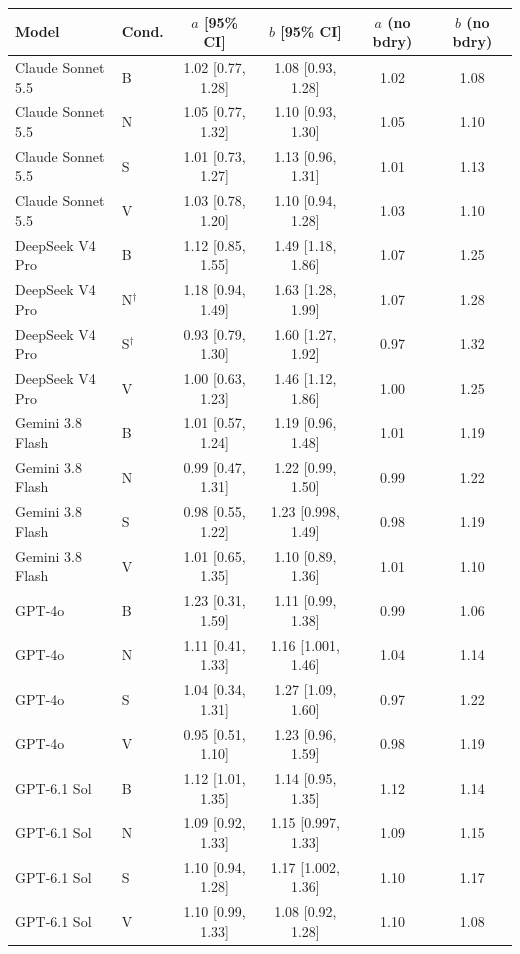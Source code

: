 \begin{tabular}{llcccc}
\toprule
Model & Cond. & $a$ [95\% CI] & $b$ [95\% CI] & $a$ (no bdry) & $b$ (no bdry) \\
\midrule
Claude Sonnet 5.5 & B & 1.02 [0.77, 1.28] & 1.08 [0.93, 1.28] & 1.02 & 1.08 \\
Claude Sonnet 5.5 & N & 1.05 [0.77, 1.32] & 1.10 [0.93, 1.30] & 1.05 & 1.10 \\
Claude Sonnet 5.5 & S & 1.01 [0.73, 1.27] & 1.13 [0.96, 1.31] & 1.01 & 1.13 \\
Claude Sonnet 5.5 & V & 1.03 [0.78, 1.20] & 1.10 [0.94, 1.28] & 1.03 & 1.10 \\
DeepSeek V4 Pro & B & 1.12 [0.85, 1.55] & 1.49 [1.18, 1.86] & 1.07 & 1.25 \\
DeepSeek V4 Pro & N$^\dagger$ & 1.18 [0.94, 1.49] & 1.63 [1.28, 1.99] & 1.07 & 1.28 \\
DeepSeek V4 Pro & S$^\dagger$ & 0.93 [0.79, 1.30] & 1.60 [1.27, 1.92] & 0.97 & 1.32 \\
DeepSeek V4 Pro & V & 1.00 [0.63, 1.23] & 1.46 [1.12, 1.86] & 1.00 & 1.25 \\
Gemini 3.8 Flash & B & 1.01 [0.57, 1.24] & 1.19 [0.96, 1.48] & 1.01 & 1.19 \\
Gemini 3.8 Flash & N & 0.99 [0.47, 1.31] & 1.22 [0.99, 1.50] & 0.99 & 1.22 \\
Gemini 3.8 Flash & S & 0.98 [0.55, 1.22] & 1.23 [0.998, 1.49] & 0.98 & 1.19 \\
Gemini 3.8 Flash & V & 1.01 [0.65, 1.35] & 1.10 [0.89, 1.36] & 1.01 & 1.10 \\
GPT-4o & B & 1.23 [0.31, 1.59] & 1.11 [0.99, 1.38] & 0.99 & 1.06 \\
GPT-4o & N & 1.11 [0.41, 1.33] & 1.16 [1.001, 1.46] & 1.04 & 1.14 \\
GPT-4o & S & 1.04 [0.34, 1.31] & 1.27 [1.09, 1.60] & 0.97 & 1.22 \\
GPT-4o & V & 0.95 [0.51, 1.10] & 1.23 [0.96, 1.59] & 0.98 & 1.19 \\
GPT-6.1 Sol & B & 1.12 [1.01, 1.35] & 1.14 [0.95, 1.35] & 1.12 & 1.14 \\
GPT-6.1 Sol & N & 1.09 [0.92, 1.33] & 1.15 [0.997, 1.33] & 1.09 & 1.15 \\
GPT-6.1 Sol & S & 1.10 [0.94, 1.28] & 1.17 [1.002, 1.36] & 1.10 & 1.17 \\
GPT-6.1 Sol & V & 1.10 [0.99, 1.33] & 1.08 [0.92, 1.28] & 1.10 & 1.08 \\
\bottomrule
\end{tabular}
